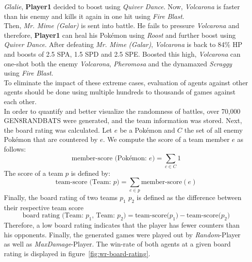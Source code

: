 \textit{Glalie}, \textbf{Player1} decided to boost using \textit{Quiver Dance}. Now, \textit{Volcarona}
is faster than his enemy and kills it again in one hit using \textit{Fire Blast}. \\
Then, \textit{Mr. Mime (Galar)} is sent into battle. He fails to pressure \textit{Volcarona} and therefore,
\textbf{Player1} can heal his Pokémon using \textit{Roost} and further boost using \textit{Quiver Dance}. After
defeating \textit{Mr. Mime (Galar)}, \textit{Volcarona} is back to 84\% HP and boosts of 2.5 \ac{SPA},
1.5 \ac{SPD} and 2.5 \ac{SPE}. 
Boosted this high, \textit{Volcarona} can one-shot both the enemy \textit{Volcarona},
\textit{Pheromosa} and the dynamaxed \textit{Scraggy} using \textit{Fire Blast}. \\
To eliminate the impact of these extreme cases, evaluation of agents against other agents 
should be done using multiple hundreds to thousands of games against each other. \\
In order to quantify and better visualize the randomness of battles, over 70,000 \ac{GEN8RANDBATS}
were generated, and the team information was stored. Next, the board rating was calculated. Let $e$ be 
a Pokémon and $C$ the set of all enemy Pokémon that are countered by $e$. We compute the score of 
a team member $e$ as follows: 
\begin{equation}
  \text{member-score (Pokémon: $e$)} = \sum_{c \in C} 1
\end{equation}
The score of a team $p$ is defined by:
\begin{equation} 
  \text{team-score (Team: $p$)} = \sum_{e \in p} \text{member-score}(e)
\end{equation}
Finally, the board rating of two teams $p_1$ $p_2$ is defined as the difference between their respective 
team score
\begin{equation}
  \text{board rating (Team: $p_1$, Team: $p_2$)} = \text{team-score($p_1$)} - \text{team-score($p_2$)}
\end{equation}
Therefore, a low board rating indicates that the player has fewer counters than his opponents. Finally,
the generated games were played out by \textit{Random}-Player as well as \textit{MaxDamage}-Player. The 
win-rate of both agents at a given board rating is displayed in figure~\ref{fig:wr-board-rating}. 
